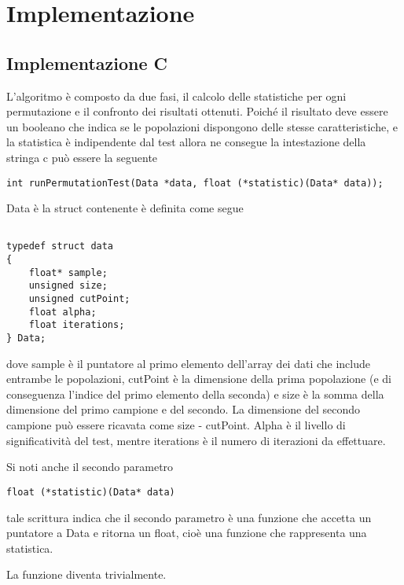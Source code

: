\section{Implementazione}

\subsection{Implementazione C} \label{impC}
L'algoritmo è composto da due fasi, il calcolo delle statistiche per ogni permutazione e il confronto dei risultati ottenuti.
Poiché il risultato deve essere un booleano che indica se le popolazioni dispongono delle stesse caratteristiche, e la statistica è indipendente dal test allora ne consegue la intestazione della stringa c può essere la seguente


\begin{lstlisting}[style=CStyle]
int runPermutationTest(Data *data, float (*statistic)(Data* data));
\end{lstlisting}

Data è la struct contenente è definita come segue

\begin{lstlisting}[style=CStyle]

typedef struct data
{	
	float* sample;
	unsigned size;
	unsigned cutPoint;
	float alpha;
	float iterations;
} Data;

\end{lstlisting}

dove sample è il puntatore al primo elemento dell'array dei dati che include entrambe le popolazioni, cutPoint è la dimensione della prima popolazione (e di conseguenza l'indice del primo elemento della seconda) e size è la somma della dimensione del primo campione e del secondo. La dimensione del secondo campione può essere ricavata come size - cutPoint. Alpha è il livello di significatività del test, mentre iterations è il numero di iterazioni da effettuare.

Si noti anche il secondo parametro
\begin{lstlisting}[style=CStyle]
float (*statistic)(Data* data)
\end{lstlisting}

tale scrittura indica che il secondo parametro è una funzione che accetta un puntatore a Data e ritorna un float, cioè una funzione che rappresenta una statistica.

La funzione diventa trivialmente.


